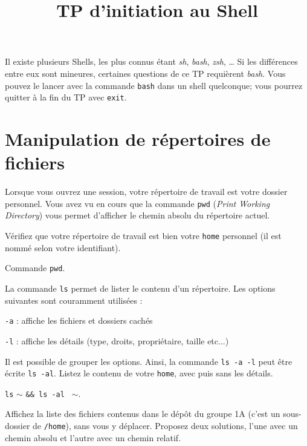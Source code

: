 \documentclass{scrartcl}
\title{TP d'initiation au Shell}
\begin{document}
\maketitle

Il existe plusieurs Shells, les plus connus étant \textit{sh}, \textit{bash}, \textit{zsh}, \ldots
Si les différences entre eux sont mineures, certaines questions de ce TP requièrent  \textit{bash}. Vous pouvez le lancer avec la commande \lstinline|bash| dans un shell quelconque; vous pourrez quitter à la fin du TP avec \lstinline|exit|.

\section{Manipulation de répertoires de fichiers}

Lorsque vous ouvrez une session, votre répertoire de travail est votre dossier personnel.
Vous avez vu en cours que la commande \lstinline|pwd| (\emph{Print Working Directory}) vous permet d’afficher le chemin absolu du répertoire actuel.

\begin{question}[name=Q.]
	Vérifiez que votre répertoire de travail est bien votre \lstinline|home| personnel (il est nommé selon votre identifiant).
\end{question}
\begin{solution}
	Commande \lstinline|pwd|.
\end{solution}

\begin{question}[name=Q.]
	La commande \lstinline|ls| permet de lister le contenu d’un répertoire. Les options suivantes sont couramment utilisées :
	\begin{description}
		\item \lstinline|-a| :
		affiche les fichiers et dossiers cachés
		\item \lstinline|-l| :
		affiche les détails (type, droits, propriétaire, taille etc...)
	\end{description}
	Il est possible de grouper les options. Ainsi, la commande \lstinline|ls -a -l| peut être écrite \lstinline|ls -al|.
	Listez le contenu de votre \lstinline|home|, avec puis sans les détails.
\end{question}
\begin{solution}
	\lstinline|ls| $\sim$ \lstinline|&& ls -al | $\sim$.
\end{solution}

\begin{question}[name=Q.]
	Affichez la liste des fichiers contenus dans le dépôt du groupe 1A (c'est un sous-dossier de \lstinline|/home|), sans vous y déplacer. Proposez deux solutions, l'une avec un chemin absolu et l'autre avec un chemin relatif.
\end{question}
\begin{solution}
\end{solution}
\end{document}
